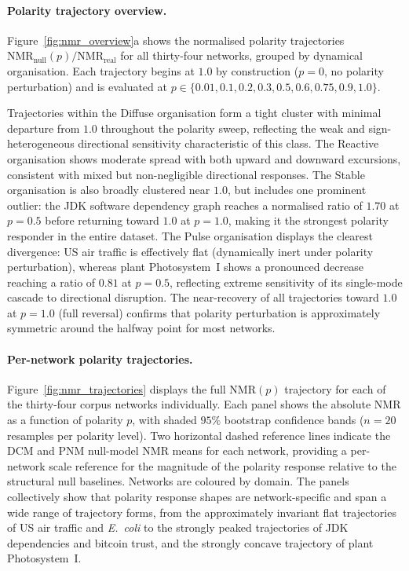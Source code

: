 \documentclass[aps,superscriptaddress,11pt]{revtex4-2}
\newcommand{\NMR}{\mathrm{NMR}}
\theoremstyle{definition}
\theoremstyle{plain}
\begin{document}
\paragraph{Polarity trajectory overview.}
Figure~\ref{fig:nmr_overview}a shows the normalised polarity trajectories
$\NMR_{\mathrm{null}}(p)/\NMR_{\mathrm{real}}$ for all thirty-four
networks, grouped by dynamical organisation.  Each trajectory begins at
$1.0$ by construction ($p=0$, no polarity perturbation) and is evaluated
at $p \in \{0.01, 0.1, 0.2, 0.3, 0.5, 0.6, 0.75, 0.9, 1.0\}$.

Trajectories within the Diffuse organisation form a tight cluster with
minimal departure from $1.0$ throughout the polarity sweep, reflecting the
weak and sign-heterogeneous directional sensitivity characteristic of
this class.  The Reactive organisation shows moderate spread with both
upward and downward excursions, consistent with mixed but non-negligible
directional responses.  The Stable organisation is also broadly clustered
near $1.0$, but includes one prominent outlier: the JDK software dependency
graph reaches a normalised ratio of $1.70$ at $p=0.5$ before returning
toward $1.0$ at $p=1.0$, making it the strongest polarity responder in
the entire dataset.  The Pulse organisation displays the clearest
divergence: US air traffic is effectively flat (dynamically inert under
polarity perturbation), whereas plant Photosystem~I shows a pronounced
decrease reaching a ratio of $0.81$ at $p=0.5$, reflecting extreme
sensitivity of its single-mode cascade to directional disruption.  The
near-recovery of all trajectories toward $1.0$ at $p=1.0$ (full reversal)
confirms that polarity perturbation is approximately symmetric around the
halfway point for most networks.

\paragraph{Per-network polarity trajectories.}
Figure~\ref{fig:nmr_trajectories} displays the full NMR$(p)$ trajectory
for each of the thirty-four corpus networks individually.  Each panel
shows the absolute NMR as a function of polarity $p$, with shaded $95\%$
bootstrap confidence bands ($n=20$ resamples per polarity level).  Two
horizontal dashed reference lines indicate the DCM and PNM null-model NMR
means for each network, providing a per-network scale reference for the
magnitude of the polarity response relative to the structural null baselines.
Networks are coloured by domain.  The panels collectively show that polarity
response shapes are network-specific and span a wide range of trajectory
forms, from the approximately invariant flat trajectories of US air traffic
and \textit{E.~coli} to the strongly peaked trajectories of JDK
dependencies and bitcoin trust, and the strongly concave trajectory of
plant Photosystem~I.
\end{document}
